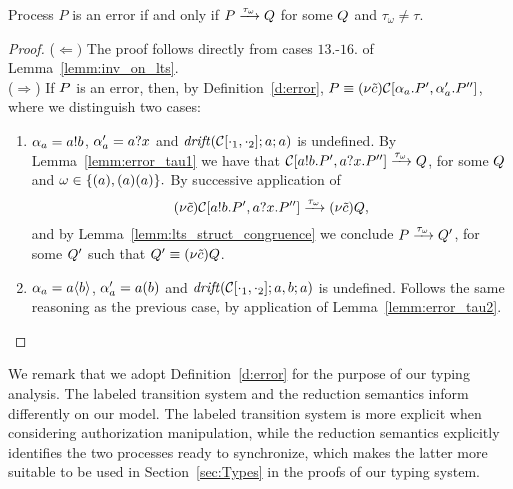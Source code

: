 \begin{proposition}
\label{th:error_lts}
  Process $P$ is an error if and only if $P\xrightarrow{\tau_\omega}Q$ for some $Q$  and  $\tau_\omega \neq \tau$.
 \end{proposition}
 \begin{proof}
 ($\Leftarrow)$
     The proof follows directly from cases $13.$-$16.$ of  Lemma~\ref{lemm:inv_on_lts}.\\
($\Rightarrow$)
      If $P$ is an error, then, by Definition~\ref{d:error}, $P\equiv (\nu \tilde{c}) \mathcal{C}[\alpha_a.P', \alpha_a'.P'']$, where we distinguish two cases:
\begin{enumerate}
\item 
$\alpha_a = a!b$, 
$\alpha_a' = a?x$
and
$ \mathit {drift}(\mathcal{C}[\cdot_1,\cdot_2];a;a)$  is undefined. By Lemma~\ref{lemm:error_tau1} we have that  
$\mathcal{C}[a!b.P',  a?x.P'']\xrightarrow{\tau_\omega}Q$, for some $Q$ and  $\omega \in\{(a), (a) (a)\}.$ By successive application of   
\[
(\nu \tilde{c})\mathcal{C}[a!b.P',  a?x.P'']\xrightarrow{\tau_\omega}(\nu \tilde{c})Q,
\]
and by Lemma~\ref{lemm:lts_struct_congruence} we conclude $P\xrightarrow{\tau_\omega}Q'$, for some $Q'$ such that $Q'\equiv(\nu \tilde{c})Q$.
\item 
$\alpha_a = a\langle b\rangle$, 
$\alpha_a' = a(b)$
and
$ \mathit {drift}(\mathcal{C}[\cdot_1,\cdot_2];a,b;a)$ is undefined. Follows the same reasoning as the previous case, by application of Lemma~\ref{lemm:error_tau2}.
\end{enumerate} 
      
 \end{proof}




We remark that we adopt Definition~\ref{d:error} for the purpose of our typing analysis. %
The labeled transition system and the reduction semantics inform differently on our model. %
The labeled transition system is more explicit when considering authorization manipulation, while the reduction semantics explicitly identifies the two processes ready to synchronize, which makes the latter more suitable to be used in Section~\ref{sec:Types} in the proofs of our typing system.  %




